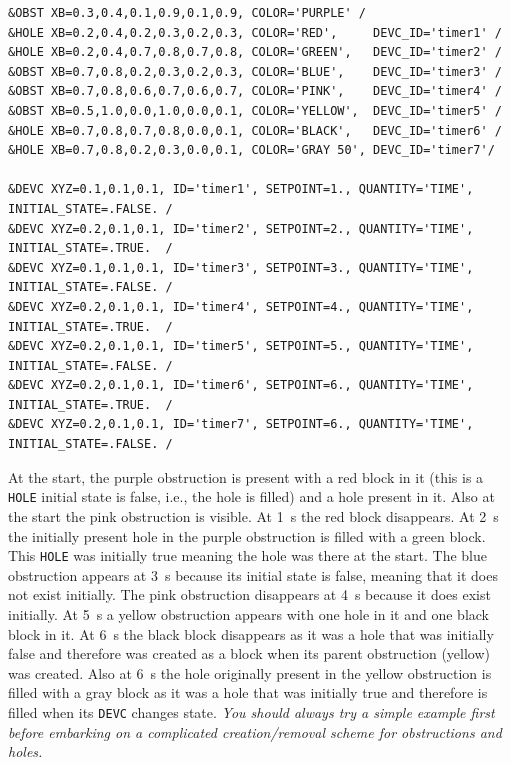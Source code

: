 \documentclass[11pt]{book}
\newcommand{\ct}{\tt\small}
\begin{document}
\footnotesize
\begin{verbatim}
&OBST XB=0.3,0.4,0.1,0.9,0.1,0.9, COLOR='PURPLE' /
&HOLE XB=0.2,0.4,0.2,0.3,0.2,0.3, COLOR='RED',     DEVC_ID='timer1' /
&HOLE XB=0.2,0.4,0.7,0.8,0.7,0.8, COLOR='GREEN',   DEVC_ID='timer2' /
&OBST XB=0.7,0.8,0.2,0.3,0.2,0.3, COLOR='BLUE',    DEVC_ID='timer3' /
&OBST XB=0.7,0.8,0.6,0.7,0.6,0.7, COLOR='PINK',    DEVC_ID='timer4' /
&OBST XB=0.5,1.0,0.0,1.0,0.0,0.1, COLOR='YELLOW',  DEVC_ID='timer5' /
&HOLE XB=0.7,0.8,0.7,0.8,0.0,0.1, COLOR='BLACK',   DEVC_ID='timer6' /
&HOLE XB=0.7,0.8,0.2,0.3,0.0,0.1, COLOR='GRAY 50', DEVC_ID='timer7'/

&DEVC XYZ=0.1,0.1,0.1, ID='timer1', SETPOINT=1., QUANTITY='TIME', INITIAL_STATE=.FALSE. /
&DEVC XYZ=0.2,0.1,0.1, ID='timer2', SETPOINT=2., QUANTITY='TIME', INITIAL_STATE=.TRUE.  /
&DEVC XYZ=0.1,0.1,0.1, ID='timer3', SETPOINT=3., QUANTITY='TIME', INITIAL_STATE=.FALSE. /
&DEVC XYZ=0.2,0.1,0.1, ID='timer4', SETPOINT=4., QUANTITY='TIME', INITIAL_STATE=.TRUE.  /
&DEVC XYZ=0.2,0.1,0.1, ID='timer5', SETPOINT=5., QUANTITY='TIME', INITIAL_STATE=.FALSE. /
&DEVC XYZ=0.2,0.1,0.1, ID='timer6', SETPOINT=6., QUANTITY='TIME', INITIAL_STATE=.TRUE.  /
&DEVC XYZ=0.2,0.1,0.1, ID='timer7', SETPOINT=6., QUANTITY='TIME', INITIAL_STATE=.FALSE. /

\end{verbatim}
\normalsize

\noindent
At the start, the purple obstruction is present with a red block in it (this is a {\ct HOLE} initial state is false, i.e., the hole is filled) and a hole present in it.  Also at the start the pink obstruction is visible.  At 1~s the red block disappears.  At 2~s the initially present hole in the purple obstruction is filled with a green block.  This {\ct HOLE} was initially true meaning the hole was there at the start.  The blue obstruction appears at 3~s because its initial state is false, meaning that it does not exist initially. The pink obstruction disappears at 4~s because it does exist initially. At 5~s a yellow obstruction appears with one hole in it and one black block in it.  At 6~s the black block disappears as it was a hole that was initially false and therefore was created as a block when its parent obstruction (yellow) was created.  Also at 6~s the hole originally present in the yellow obstruction is filled with a gray block as it was a hole that was initially true and therefore is filled when its {\ct DEVC} changes state.  {\em You should always try a simple example first before embarking on a complicated creation/removal scheme for obstructions and holes.}
\end{document}
